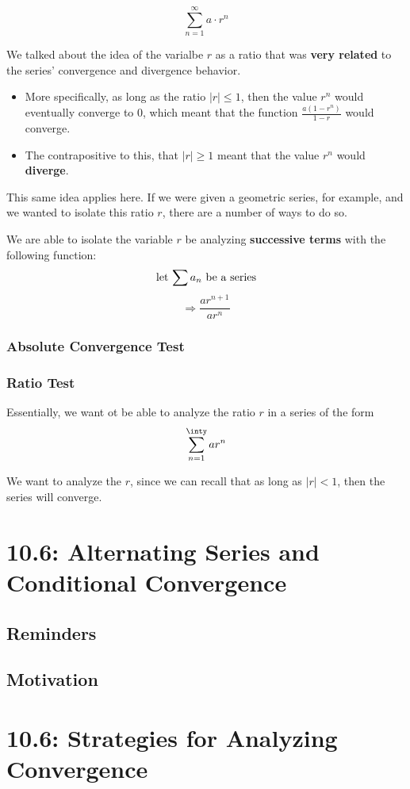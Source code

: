 \documentclass{report}
\begin{document}
\begin{sloppypar}
\[ \sum_{n=1}^{\infty} a \cdot r^{n} \]

We talked about the idea of the varialbe $ r $ as a ratio that was \textbf{very related}
to the series' convergence and divergence behavior.
\begin{itemize}
  \item More specifically, as long as the ratio $ | r | \leq 1 $, then the value $ r^{n} $ would
        eventually converge to 0, which meant that the function $ \frac{a(1-r^{n})}{1-r} $ would
        converge.
  \item The contrapositive to this, that $ | r | \geq 1 $ meant that the value $ r^{n} $ would
        \textbf{diverge}.
\end{itemize}

This same idea applies here. If we were given a geometric series, for example, and we
wanted to isolate this ratio $ r $, there are a number of ways to do so.

We are able to isolate the variable $ r $ be analyzing \textbf{successive terms} with
the following function:
\[ \textrm{let $ \sum a_{n}$ be a series} \]
\[ \Rightarrow \frac{ar^{n+1}}{ar^{n}}\]

\subsection{Absolute Convergence Test}
\subsection{Ratio Test}
Essentially, we want ot be able to analyze the ratio $ r $ in a
series of the form
\[ \sum_{n=1}^{\inty} ar^{n} \]

We want to analyze the $ r $, since we can recall that as long as $ |r| < 1 $, then
the series will converge.

\chapter{10.6: Alternating Series and Conditional Convergence}
\section{Reminders}
\section{Motivation}
\chapter{10.6: Strategies for Analyzing Convergence}

\end{sloppypar}
\end{document}
